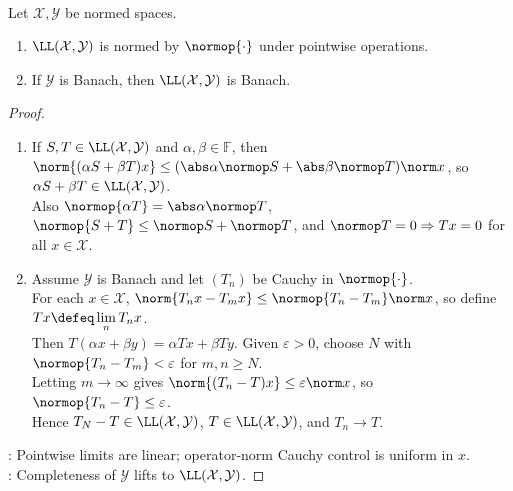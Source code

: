 \begin{theorem} \label{thm:operator-space-banach} \\
Let $\mathcal{X},\mathcal{Y}$ be normed spaces.
\begin{enumerate}[label=(\roman*)]
\setlength{\itemsep}{0pt}
\item $\LL(\mathcal{X},\mathcal{Y})$ is normed by $\normop{\cdot}$ under pointwise operations.
\item If $\mathcal{Y}$ is Banach, then $\LL(\mathcal{X},\mathcal{Y})$ is Banach.
\end{enumerate}
\begin{proof}
\begin{enumerate}[label=(\roman*)]
\setlength{\itemsep}{0pt}
\item If $S,T\in\LL(\mathcal X,\mathcal Y)$ and $\alpha,\beta\in\mathbb F$, then $\norm{(\alpha S+\beta T)x}\leq(\abs\alpha\normop S+\abs\beta\normop T)\norm x$, so $\alpha S+\beta T\in\LL(\mathcal X,\mathcal Y)$.\\
Also $\normop{\alpha T}=\abs\alpha\normop T$, $\normop{S+T}\leq\normop S+\normop T$, and $\normop T=0\Rightarrow Tx=0$ for all $x\in\mathcal X$.
\item Assume $\mathcal Y$ is Banach and let $(T_n)$ be Cauchy in $\normop{\cdot}$.\\
For each $x\in\mathcal X$, $\norm{T_nx-T_mx}\leq\normop{T_n-T_m}\norm x$, so define $Tx\defeq\lim\limits_nT_nx$.\\
Then $T(\alpha x+\beta y)=\alpha Tx+\beta Ty$. Given $\varepsilon>0$, choose $N$ with $\normop{T_n-T_m}<\varepsilon$ for $m,n\geq N$.\\
Letting $m\to\infty$ gives $\norm{(T_n-T)x}\leq\varepsilon\norm x$, so $\normop{T_n-T}\leq\varepsilon$.\\
Hence $T_N-T\in\LL(\mathcal X,\mathcal Y)$, $T\in\LL(\mathcal X,\mathcal Y)$, and $T_n\to T$.
\end{enumerate}
: Pointwise limits are linear; operator-norm Cauchy control is uniform in $x$.\\
: Completeness of $\mathcal Y$ lifts to $\LL(\mathcal X,\mathcal Y)$.
\end{proof}
\end{theorem}


